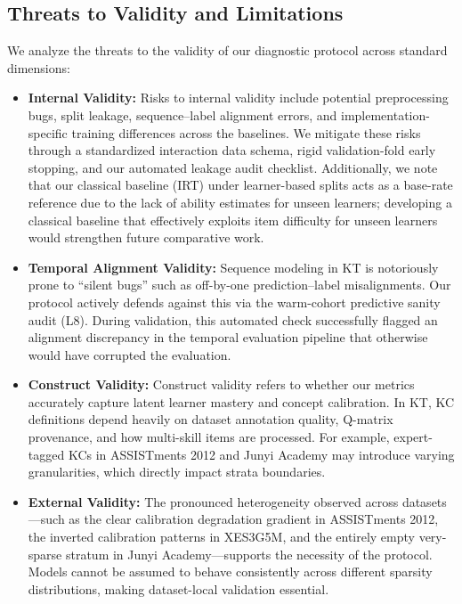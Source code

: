 \subsection{Threats to Validity and Limitations}
\label{sec:threats}
We analyze the threats to the validity of our diagnostic protocol across standard dimensions:
\begin{itemize}
    \item \textbf{Internal Validity:} Risks to internal validity include potential preprocessing bugs, split leakage, sequence--label alignment errors, and implementation-specific training differences across the baselines. We mitigate these risks through a standardized interaction data schema, rigid validation-fold early stopping, and our automated leakage audit checklist. Additionally, we note that our classical baseline (IRT) under learner-based splits acts as a base-rate reference due to the lack of ability estimates for unseen learners; developing a classical baseline that effectively exploits item difficulty for unseen learners would strengthen future comparative work.
    \item \textbf{Temporal Alignment Validity:} Sequence modeling in KT is notoriously prone to ``silent bugs'' such as off-by-one prediction--label misalignments. Our protocol actively defends against this via the warm-cohort predictive sanity audit (L8). During validation, this automated check successfully flagged an alignment discrepancy in the temporal evaluation pipeline that otherwise would have corrupted the evaluation.
    \item \textbf{Construct Validity:} Construct validity refers to whether our metrics accurately capture latent learner mastery and concept calibration. In KT, KC definitions depend heavily on dataset annotation quality, Q-matrix provenance, and how multi-skill items are processed. For example, expert-tagged KCs in ASSISTments 2012 and Junyi Academy may introduce varying granularities, which directly impact strata boundaries.
    \item \textbf{External Validity:} The pronounced heterogeneity observed across datasets---such as the clear calibration degradation gradient in ASSISTments 2012, the inverted calibration patterns in XES3G5M, and the entirely empty very-sparse stratum in Junyi Academy---supports the necessity of the protocol. Models cannot be assumed to behave consistently across different sparsity distributions, making dataset-local validation essential.

\end{itemize}

